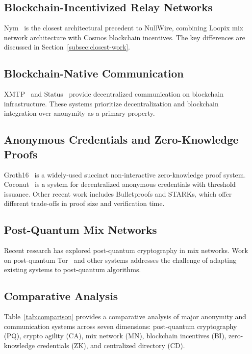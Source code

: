 \documentclass[11pt]{article}
\theoremstyle{definition}
\theoremstyle{remark}
\begin{document}
\subsection{Blockchain-Incentivized Relay Networks}

Nym~\cite{nym2020} is the closest architectural precedent to NullWire, combining Loopix mix network architecture with Cosmos blockchain incentives. The key differences are discussed in Section~\ref{subsec:closest-work}.

\subsection{Blockchain-Native Communication}

XMTP~\cite{xmtp} and Status~\cite{status} provide decentralized communication on blockchain infrastructure. These systems prioritize decentralization and blockchain integration over anonymity as a primary property.

\subsection{Anonymous Credentials and Zero-Knowledge Proofs}

Groth16~\cite{groth16} is a widely-used succinct non-interactive zero-knowledge proof system. Coconut~\cite{coconut} is a system for decentralized anonymous credentials with threshold issuance. Other recent work includes Bulletproofs and STARKs, which offer different trade-offs in proof size and verification time.

\subsection{Post-Quantum Mix Networks}

Recent research has explored post-quantum cryptography in mix networks. Work on post-quantum Tor~\cite{pq-tor} and other systems addresses the challenge of adapting existing systems to post-quantum algorithms.

\subsection{Comparative Analysis}

Table~\ref{tab:comparison} provides a comparative analysis of major anonymity and communication systems across seven dimensions: post-quantum cryptography (PQ), crypto agility (CA), mix network (MN), blockchain incentives (BI), zero-knowledge credentials (ZK), and centralized directory (CD).
\end{document}
